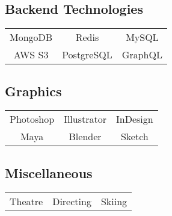 \documentclass[letterpaper]{deedy-resume} %
\begin{document}
\begin{minipage}[t]{0.33\textwidth}
  \subsection{Backend Technologies}

  \begin{tabular}{ c c c }
    MongoDB & Redis & MySQL \\
    AWS S3 & PostgreSQL & GraphQL
  \end{tabular}

  \vspace{4mm}

  \subsection{Graphics}

  \begin{tabular}{ c c c }
    Photoshop & Illustrator & InDesign \\
    Maya & Blender & Sketch
  \end{tabular}

  \vspace{4mm}

  \subsection{Miscellaneous}

  \begin{tabular}{ c c c }
    Theatre & Directing & Skiing
  \end{tabular}

  
  \sectionspace %



\end{minipage} %
\hfill
%
%
\end{document}
